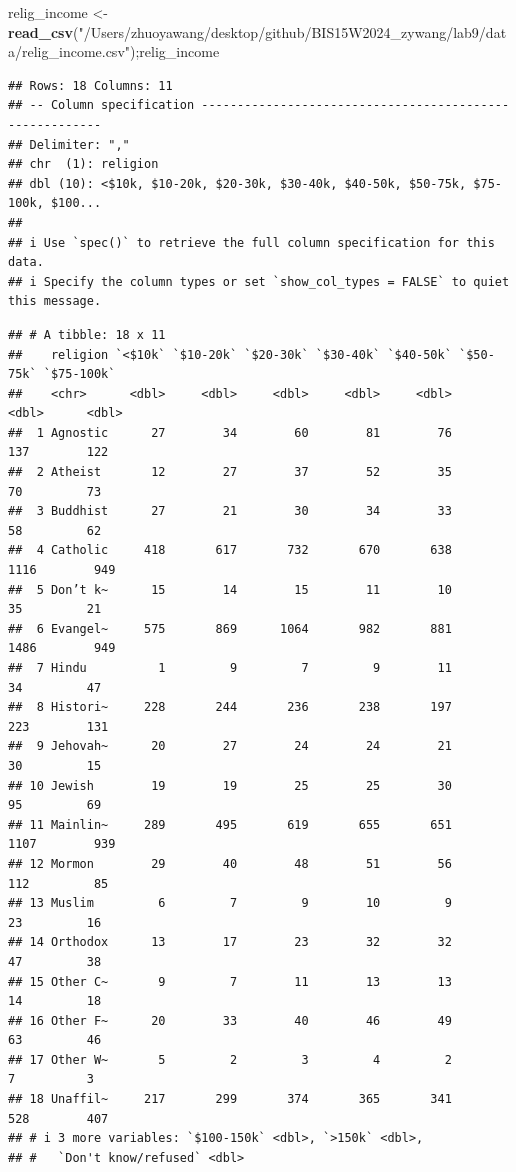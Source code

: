 \documentclass[
]{article}
\newenvironment{Shaded}{\begin{snugshade}}{\end{snugshade}}
\newcommand{\FunctionTok}[1]{\textcolor[rgb]{0.13,0.29,0.53}{\textbf{#1}}}
\newcommand{\NormalTok}[1]{#1}
\newcommand{\OtherTok}[1]{\textcolor[rgb]{0.56,0.35,0.01}{#1}}
\newcommand{\StringTok}[1]{\textcolor[rgb]{0.31,0.60,0.02}{#1}}
\begin{document}
\begin{Shaded}
\begin{Highlighting}[]
\NormalTok{relig\_income }\OtherTok{\textless{}{-}} \FunctionTok{read\_csv}\NormalTok{(}\StringTok{"/Users/zhuoyawang/desktop/github/BIS15W2024\_zywang/lab9/data/relig\_income.csv"}\NormalTok{);relig\_income}
\end{Highlighting}
\end{Shaded}

\begin{verbatim}
## Rows: 18 Columns: 11
## -- Column specification --------------------------------------------------------
## Delimiter: ","
## chr  (1): religion
## dbl (10): <$10k, $10-20k, $20-30k, $30-40k, $40-50k, $50-75k, $75-100k, $100...
## 
## i Use `spec()` to retrieve the full column specification for this data.
## i Specify the column types or set `show_col_types = FALSE` to quiet this message.
\end{verbatim}

\begin{verbatim}
## # A tibble: 18 x 11
##    religion `<$10k` `$10-20k` `$20-30k` `$30-40k` `$40-50k` `$50-75k` `$75-100k`
##    <chr>      <dbl>     <dbl>     <dbl>     <dbl>     <dbl>     <dbl>      <dbl>
##  1 Agnostic      27        34        60        81        76       137        122
##  2 Atheist       12        27        37        52        35        70         73
##  3 Buddhist      27        21        30        34        33        58         62
##  4 Catholic     418       617       732       670       638      1116        949
##  5 Don’t k~      15        14        15        11        10        35         21
##  6 Evangel~     575       869      1064       982       881      1486        949
##  7 Hindu          1         9         7         9        11        34         47
##  8 Histori~     228       244       236       238       197       223        131
##  9 Jehovah~      20        27        24        24        21        30         15
## 10 Jewish        19        19        25        25        30        95         69
## 11 Mainlin~     289       495       619       655       651      1107        939
## 12 Mormon        29        40        48        51        56       112         85
## 13 Muslim         6         7         9        10         9        23         16
## 14 Orthodox      13        17        23        32        32        47         38
## 15 Other C~       9         7        11        13        13        14         18
## 16 Other F~      20        33        40        46        49        63         46
## 17 Other W~       5         2         3         4         2         7          3
## 18 Unaffil~     217       299       374       365       341       528        407
## # i 3 more variables: `$100-150k` <dbl>, `>150k` <dbl>,
## #   `Don't know/refused` <dbl>
\end{verbatim}
\end{document}
